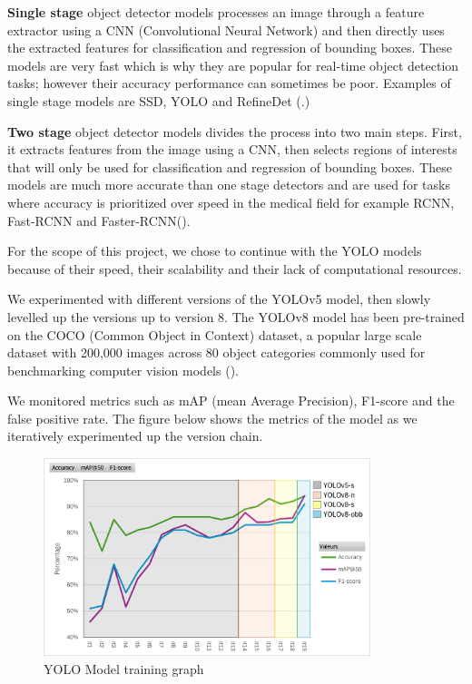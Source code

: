 \newpage{}
\textbf{Single stage} object detector models processes an image through a
feature extractor using a CNN (Convolutional Neural Network) and then directly
uses the extracted features for classification and regression of bounding boxes.
These models are very fast which is why they are popular for real-time object
detection tasks; however their accuracy performance can sometimes be poor.
Examples of single stage models are SSD, YOLO and RefineDet
(\cite{YOLOversionsliterature}.)

\textbf{Two stage} object detector models divides the process into two main
steps. First, it extracts features from the image using a CNN, then selects
regions of interests that will only be used for classification and regression of
bounding boxes. These models are much more accurate than one stage detectors and
are used for tasks where accuracy is prioritized over speed in the medical field
for example RCNN, Fast-RCNN and Faster-RCNN(\cite{singlevstwostagedetectors}).

For the scope of this project, we chose to continue with the YOLO models because
of their speed, their scalability and their lack of computational resources.

We experimented with different versions of the YOLOv5 model, then slowly
levelled up the versions up to version 8.  The YOLOv8 model has been pre-trained
on the COCO (Common Object in Context) dataset, a popular large scale dataset
with 200,000 images across 80 object categories commonly used for benchmarking
computer vision models (\cite{cocodataset}).

We monitored metrics such as mAP (mean Average Precision), F1-score and the
false positive rate. The figure below shows the metrics of the model as we
iteratively experimented up the version chain.

\begin{figure}[htbp]
  \centering
  \includegraphics[width=0.85\textwidth]{images/YOLO-results.png}
  \caption{YOLO Model training graph}
\end{figure}

